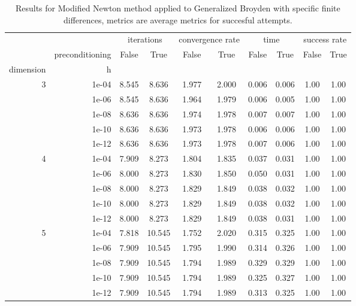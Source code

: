 \begin{table}
\centering
\caption{Results for Modified Newton method applied to Generalized Broyden with specific finite differences, metrics are average metrics for succesful attempts.}
\label{tab:Modified_Newton_Generalized_Broyden_fd_rel}
\begin{tabular}{rr|cc|cc|cc|cc}
\toprule
    &  & \multicolumn{2}{|c}{iterations} & \multicolumn{2}{|c}{convergence rate} & \multicolumn{2}{|c}{time} & \multicolumn{2}{|c}{success rate} \\
    & preconditioning & False & True & False & True & False & True & False & True \\
dimension & h &  &  &  &  &  &  &  &  \\
\midrule
\multirow[t]{5}{*}{3} & 1e-04 & 8.545 & 8.636 & 1.977 & 2.000 & 0.006 & 0.006 & 1.00 & 1.00 \\
    & 1e-06 & 8.545 & 8.636 & 1.964 & 1.979 & 0.006 & 0.005 & 1.00 & 1.00 \\
    & 1e-08 & 8.636 & 8.636 & 1.974 & 1.978 & 0.007 & 0.007 & 1.00 & 1.00 \\
    & 1e-10 & 8.636 & 8.636 & 1.973 & 1.978 & 0.006 & 0.006 & 1.00 & 1.00 \\
    & 1e-12 & 8.636 & 8.636 & 1.973 & 1.978 & 0.007 & 0.006 & 1.00 & 1.00 \\
\cline{1-10}
\multirow[t]{5}{*}{4} & 1e-04 & 7.909 & 8.273 & 1.804 & 1.835 & 0.037 & 0.031 & 1.00 & 1.00 \\
    & 1e-06 & 8.000 & 8.273 & 1.830 & 1.850 & 0.050 & 0.031 & 1.00 & 1.00 \\
    & 1e-08 & 8.000 & 8.273 & 1.829 & 1.849 & 0.038 & 0.032 & 1.00 & 1.00 \\
    & 1e-10 & 8.000 & 8.273 & 1.829 & 1.849 & 0.038 & 0.032 & 1.00 & 1.00 \\
    & 1e-12 & 8.000 & 8.273 & 1.829 & 1.849 & 0.038 & 0.031 & 1.00 & 1.00 \\
\cline{1-10}
\multirow[t]{5}{*}{5} & 1e-04 & 7.818 & 10.545 & 1.752 & 2.020 & 0.315 & 0.325 & 1.00 & 1.00 \\
    & 1e-06 & 7.909 & 10.545 & 1.795 & 1.990 & 0.314 & 0.326 & 1.00 & 1.00 \\
    & 1e-08 & 7.909 & 10.545 & 1.794 & 1.989 & 0.329 & 0.329 & 1.00 & 1.00 \\
    & 1e-10 & 7.909 & 10.545 & 1.794 & 1.989 & 0.325 & 0.327 & 1.00 & 1.00 \\
    & 1e-12 & 7.909 & 10.545 & 1.794 & 1.989 & 0.313 & 0.325 & 1.00 & 1.00 \\
\cline{1-10}
\bottomrule
\end{tabular}
\end{table}

